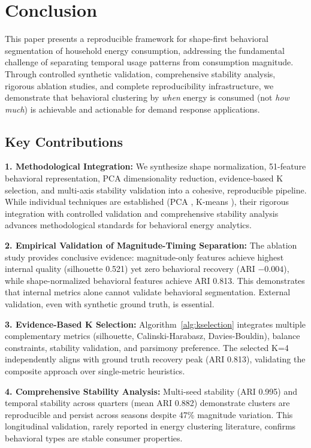\section{Conclusion}
\label{sec:conclusion}

This paper presents a reproducible framework for shape-first behavioral segmentation of household energy consumption, addressing the fundamental challenge of separating temporal usage patterns from consumption magnitude. Through controlled synthetic validation, comprehensive stability analysis, rigorous ablation studies, and complete reproducibility infrastructure, we demonstrate that behavioral clustering by \emph{when} energy is consumed (not \emph{how much}) is achievable and actionable for demand response applications.

\subsection{Key Contributions}

\textbf{1. Methodological Integration:} We synthesize shape normalization, 51-feature behavioral representation, PCA dimensionality reduction, evidence-based K selection, and multi-axis stability validation into a cohesive, reproducible pipeline. While individual techniques are established (PCA \cite{jolliffe2002pca}, K-means \cite{lloyd1982least,arthur2007kmeans}), their rigorous integration with controlled validation and comprehensive stability analysis advances methodological standards for behavioral energy analytics.

\textbf{2. Empirical Validation of Magnitude-Timing Separation:} The ablation study provides conclusive evidence: magnitude-only features achieve highest internal quality (silhouette 0.521) yet zero behavioral recovery (ARI $-0.004$), while shape-normalized behavioral features achieve ARI 0.813. This demonstrates that internal metrics alone cannot validate behavioral segmentation. External validation, even with synthetic ground truth, is essential.

\textbf{3. Evidence-Based K Selection:} Algorithm~\ref{alg:kselection} integrates multiple complementary metrics (silhouette, Calinski-Harabasz, Davies-Bouldin), balance constraints, stability validation, and parsimony preference. The selected K=4 independently aligns with ground truth recovery peak (ARI 0.813), validating the composite approach over single-metric heuristics.

\textbf{4. Comprehensive Stability Analysis:} Multi-seed stability (ARI 0.995) and temporal stability across quarters (mean ARI 0.882) demonstrate clusters are reproducible and persist across seasons despite 47\% magnitude variation. This longitudinal validation, rarely reported in energy clustering literature, confirms behavioral types are stable consumer properties.

